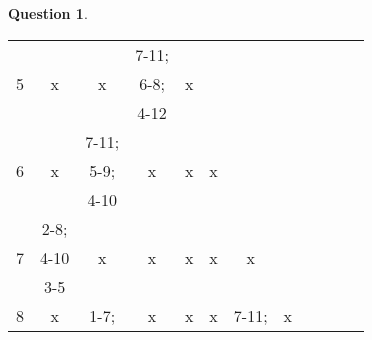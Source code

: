 \documentclass[11pt,a4paper,dvipsnames,]{article}
\theoremstyle{definition}%
\newtheorem{Q}{Question}[] %
\begin{document}
\begin{Q}
{\begin{center}
\begin{tabular}{|c|c|c|c|c|c|c|c|c|c|c|c|}
				\multirow{3}{*}{5} & \multirow{3}{*}{x} & \multirow{3}{*}{x} & \cellcolor{red!25}7-11; & \multirow{3}{*}{x} & \cellcolor{gray!20} & \cellcolor{gray!20} & \cellcolor{gray!20} & \cellcolor{gray!20} & \cellcolor{gray!20} & \cellcolor{gray!20} & \cellcolor{gray!20}\\
				 &  &  & \cellcolor{red!25}6-8; &  & \cellcolor{gray!20} &  \cellcolor{gray!20}&  \cellcolor{gray!20}& \cellcolor{gray!20} & \cellcolor{gray!20} & \cellcolor{gray!20} & \cellcolor{gray!20}\\
				 &  &  & \cellcolor{red!25}4-12 &  & \cellcolor{gray!20} &  \cellcolor{gray!20}& \cellcolor{gray!20} & \cellcolor{gray!20} & \cellcolor{gray!20} & \cellcolor{gray!20} & \cellcolor{gray!20}\\ \hline
				\multirow{3}{*}{6} & \multirow{3}{*}{x} & \cellcolor{green!25}7-11; & \multirow{3}{*}{x} & \multirow{3}{*}{x} & \multirow{3}{*}{x} & \cellcolor{gray!20} &\cellcolor{gray!20}  & \cellcolor{gray!20} & \cellcolor{gray!20} & \cellcolor{gray!20} & \cellcolor{gray!20}\\
				 &  & \cellcolor{green!25}5-9; &  &  &  & \cellcolor{gray!20} &  \cellcolor{gray!20}&  \cellcolor{gray!20}& \cellcolor{gray!20} & \cellcolor{gray!20} & \cellcolor{gray!20}\\
				 &  & \cellcolor{green!25}4-10 &  &  &  & \cellcolor{gray!20} & \cellcolor{gray!20} &\cellcolor{gray!20}  & \cellcolor{gray!20} & \cellcolor{gray!20} &\cellcolor{gray!20}\\ \hline
				\multirow{3}{*}{7} & \cellcolor{red!25}2-8; & \multirow{3}{*}{x} & \multirow{3}{*}{x} & \multirow{3}{*}{x} & \multirow{3}{*}{x} & \multirow{3}{*}{x} & \cellcolor{gray!20} &  \cellcolor{gray!20}&  \cellcolor{gray!20}& \cellcolor{gray!20} & \cellcolor{gray!20}\\
				 & \cellcolor{red!25}4-10 &  & & &  &  & \cellcolor{gray!20} & \cellcolor{gray!20} & \cellcolor{gray!20} & \cellcolor{gray!20} & \cellcolor{gray!20}\\
				 & \cellcolor{red!25}3-5 & & & &  &  & \cellcolor{gray!20} &\cellcolor{gray!20}  & \cellcolor{gray!20} & \cellcolor{gray!20} &\cellcolor{gray!20} \\ \hline
				\multirow{3}{*}{8} & \multirow{3}{*}{x}  & \cellcolor{red!25}1-7; & \multirow{3}{*}{x}  & \multirow{3}{*}{x}  & \multirow{3}{*}{x}  & \cellcolor{red!25}7-11; & \multirow{3}{*}{x}  & \cellcolor{gray!20} &  \cellcolor{gray!20}& \cellcolor{gray!20} & \cellcolor{gray!20}\\

\end{tabular}
\end{center}}
\end{Q}
\end{document}
